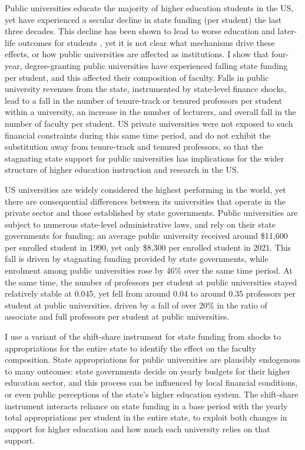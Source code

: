 \noindent
Public universities educate the majority of higher education students in the US, yet have experienced a secular decline in state funding (per student) the last three decades.
This decline has been shown to lead to worse education and later-life outcomes for students \citep{NBERw23736,NBERw27885}, yet it is not clear what mechanisms drive these effects, or how public universities are affected as institutions.
I show that four-year, degree-granting public universities have experienced falling state funding per student, and this affected their composition of faculty.
Falls in public university revenues from the state, instrumented by state-level finance shocks, lead to a fall in the number of tenure-track or tenured professors per student within a university, an increase in the number of lecturers, and overall fall in the number of faculty per student.
US private universities were not exposed to such financial constraints during this same time period, and do not exhibit the substitution away from tenure-track and tenured professors, so that the stagnating state support for public universities has implications for the wider structure of higher education instruction and research in the US.

US universities are widely considered the highest performing in the world, yet there are consequential differences between its universities that operate in the private sector and those established by state governments.
Public universities are subject to numerous state-level administrative laws, and rely on their state governments for funding: an average public university received around \$11,600 per enrolled student in 1990, yet only \$8,300 per enrolled student in 2021.
This fall is driven by stagnating funding provided by state governments, while enrolment among public universities rose by 46\% over the same time period.
At the same time, the number of professors per student at public universities stayed relatively stable at 0.045, yet fell from around 0.04 to around 0.35 professors per student at public universities, driven by a fall of over 20\% in the ratio of associate and full professors per student at public universities.

I use a variant of the \cite{NBERw23736,NBERw27885} shift-share instrument for state funding from shocks to appropriations for the entire state to identify the effect on the faculty composition.
State appropriations for public universities are plausibly endogenous to many outcomes: state governments decide on yearly budgets for their higher education sector, and this process can be influenced by local financial conditions, or even public perceptions of the state's higher education system.
The shift-share instrument interacts reliance on state funding in a base period with the yearly total appropriations per student in the entire state, to exploit both changes in support for higher education and how much each university relies on that support.

